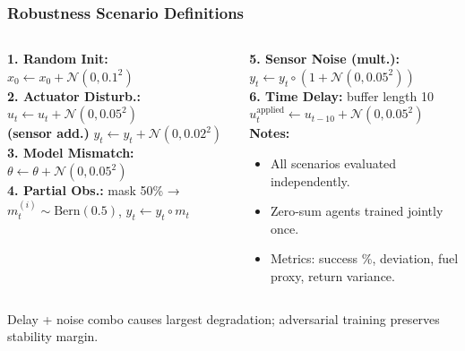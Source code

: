 \begin{frame}
    \frametitle{Robustness Scenario Definitions}
    \scriptsize
    \vspace{-0.25cm}
    \begin{columns}[T]
      \begin{column}{0.5\textwidth}
        \textbf{1. Random Init:} $x_0 \leftarrow x_0 + \mathcal{N}(0,0.1^2)$ \\
        \textbf{2. Actuator Disturb.:} $u_t \leftarrow u_t + \mathcal{N}(0,0.05^2)$ \\
        \textbf{(sensor add.)} $y_t \leftarrow y_t + \mathcal{N}(0,0.02^2)$ \\
        \textbf{3. Model Mismatch:} $\theta \leftarrow \theta + \mathcal{N}(0,0.05^2)$ \\
        \textbf{4. Partial Obs.:} mask 50\% → $m_t^{(i)}\sim \mathrm{Bern}(0.5)$, $y_t \leftarrow y_t \circ m_t$
      \end{column}
      \begin{column}{0.5\textwidth}
        \textbf{5. Sensor Noise (mult.):} $y_t \leftarrow y_t \circ (1+\mathcal{N}(0,0.05^2))$ \\
        \textbf{6. Time Delay:} buffer length 10 \\
        $u_t^{\text{applied}} \leftarrow u_{t-10} + \mathcal{N}(0,0.05^2)$ \\
        \vspace{2pt}
        \textbf{Notes:}
        \begin{itemize}\setlength{\itemsep}{1pt}
          \item All scenarios evaluated independently.
          \item Zero-sum agents trained jointly once.
          \item Metrics: success \%, deviation, fuel proxy, return variance.
        \end{itemize}
      \end{column}
    \end{columns}
    \vspace{-2pt}
    \begin{center}
      \color{mydarkblue}\tiny Delay + noise combo causes largest degradation; adversarial training preserves stability margin.
    \end{center}
\end{frame}